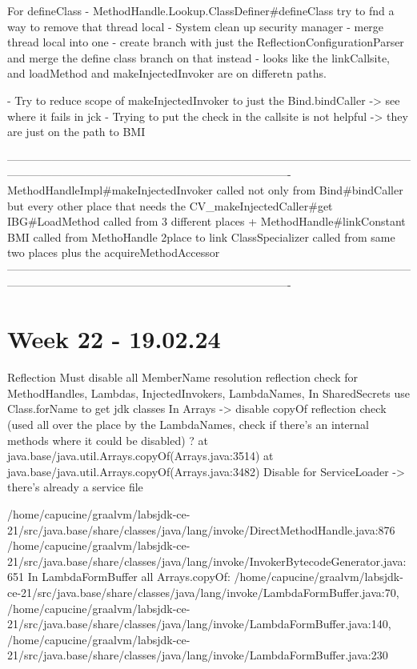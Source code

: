 For defineClass
- MethodHandle.Lookup.ClassDefiner#defineClass try to fnd a way to remove that thread local
- System clean up security manager
- merge thread local into one
- create branch with just the ReflectionConfigurationParser and merge the define class branch on that instead
- looks like the linkCallsite, and loadMethod and makeInjectedInvoker are on differetn paths.

- Try to reduce scope of makeInjectedInvoker to just the Bind.bindCaller -> see where it fails in jck
- Trying to put the check in the callsite is not helpful -> they are just on the path to BMI

----------------------------------------------------------------------------------------------------------------------------------------------------------------------------------------
MethodHandleImpl#makeInjectedInvoker called not only from Bind#bindCaller but every other place that needs the CV_makeInjectedCaller#get
 IBG#LoadMethod called from 3 different places + MethodHandle#linkConstant
 BMI called from MethoHandle 2place to link
 ClassSpecializer called from same two places plus the acquireMethodAccessor
----------------------------------------------------------------------------------------------------------------------------------------------------------------------------------------

\section{Week 22 - 19.02.24}

Reflection
Must disable all MemberName resolution reflection check for MethodHandles, Lambdas, InjectedInvokers, LambdaNames, 
In SharedSecrets use Class.forName to get jdk classes
In Arrays -> disable copyOf reflection check (used all over the place by the LambdaNames, check if there's an internal methods where it could be disabled) ?
            at java.base/java.util.Arrays.copyOf(Arrays.java:3514)
        at java.base/java.util.Arrays.copyOf(Arrays.java:3482)
Disable for ServiceLoader -> there's already a service file

/home/capucine/graalvm/labsjdk-ce-21/src/java.base/share/classes/java/lang/invoke/DirectMethodHandle.java:876
/home/capucine/graalvm/labsjdk-ce-21/src/java.base/share/classes/java/lang/invoke/InvokerBytecodeGenerator.java:651
In LambdaFormBuffer all Arrays.copyOf: /home/capucine/graalvm/labsjdk-ce-21/src/java.base/share/classes/java/lang/invoke/LambdaFormBuffer.java:70, /home/capucine/graalvm/labsjdk-ce-21/src/java.base/share/classes/java/lang/invoke/LambdaFormBuffer.java:140, /home/capucine/graalvm/labsjdk-ce-21/src/java.base/share/classes/java/lang/invoke/LambdaFormBuffer.java:230

